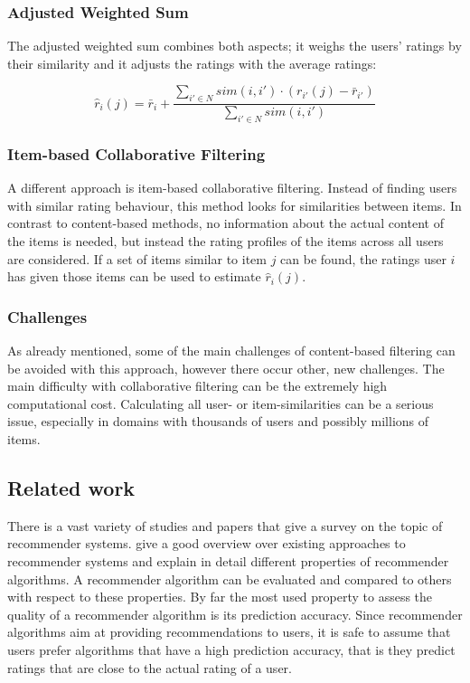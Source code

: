 \subsubsection{Adjusted Weighted Sum}
\label{ssst:adjustedweightedsum} The adjusted weighted sum combines both aspects; it weighs the users' ratings by their similarity and it adjusts the ratings with the average ratings:

\begin{equation}
\hat{r}_i(j) =  \bar{r}_i + \frac{\sum_{i' \in N}{sim(i,i')\cdot (r_{i'}(j) - \bar{r}_{i'})}}{\sum_{i' \in N}{sim(i,i')}}
\label{eq:adjustedweightedsum}
\end{equation}

\subsubsection{Item-based Collaborative Filtering}
\label{ssst:itembasedcf} A different approach is item-based collaborative filtering. Instead of finding users with similar rating behaviour, this method looks for similarities between items. In contrast to content-based methods, no information about the actual content of the items is needed, but instead the rating profiles of the items across all users are considered. If a set of items similar to item $j$ can be found, the ratings user $i$ has given those items can be used to estimate $\hat{r}_i(j)$.

\subsubsection{Challenges}
\label{ssst:challengescf} As already mentioned, some of the main challenges of content-based filtering can be avoided with this approach, however there occur other, new challenges. The main difficulty with collaborative filtering can be the extremely high computational cost. Calculating all user- or item-similarities can be a serious issue, especially in domains with thousands of users and possibly millions of items.

\subsection{Related work}
\label{sst:rsrelatedwork} There is a vast variety of studies and papers that give a survey on the topic of recommender systems. \cite{Ricci_2011} give a good overview over existing approaches to recommender systems and explain in detail different properties of recommender algorithms. A recommender algorithm can be evaluated and compared to others with respect to these properties. By far the most used property to assess the quality of a recommender algorithm is its prediction accuracy. Since recommender algorithms aim at providing recommendations to users, it is safe to assume that users prefer algorithms that have a high prediction accuracy, that is they predict ratings that are close to the actual rating of a user.

